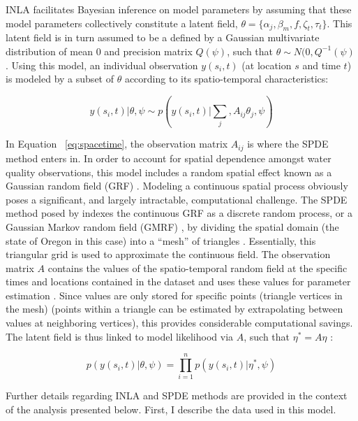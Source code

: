 \documentclass[12pt,a4paper,titlepage]{article}
\begin{document}
INLA facilitates Bayesian inference on model parameters by assuming that these model parameters collectively constitute a latent field, $\theta = \{\alpha_j,\beta_m,f,\zeta_t,\tau_t\}$. This latent field is in turn assumed to be a defined by a Gaussian multivariate distribution of mean 0 and precision matrix $Q(\psi)$, such that $\theta \sim N(0,Q^{-1}(\psi)$ \parencite{blangiardo2013,rue2005,rue2009,cosandey-godin2014}. Using this model, an individual observation $y(s_i,t)$ (at location $s$ and time $t$) is modeled by a subset of $\theta$ according to its spatio-temporal characteristics:

\begin{equation}
y(s_i,t)|\theta,\psi \sim p(y(s_i,t)|\sum_j,A_{ij}\theta_{j},\psi)
\label{eq:spacetime}
\end{equation}

In Equation ~\ref{eq:spacetime}, the observation matrix $A_{ij}$ is where the SPDE method enters in. In order to account for spatial dependence amongst water quality observations, this model includes a random spatial effect known as a Gaussian random field (GRF) \parencite{cosandey-godin2014}. Modeling a continuous spatial process obviously poses a significant, and largely intractable, computational challenge. The SPDE method posed by \textcite{lindgren2011} indexes the continuous GRF as a discrete random process, or a Gaussian Markov random field (GMRF) \parencite{lindgren2013}, by dividing the spatial domain (the state of Oregon in this case) into a “mesh” of triangles \parencite{blangiardo2013}. Essentially, this triangular grid is used to approximate the continuous field. The observation matrix $A$ contains the values of the spatio-temporal random field at the specific times and locations contained in the dataset and uses these values for parameter estimation \parencite{cosandey-godin2014}. Since values are only stored for specific points (triangle vertices in the mesh) (points within a triangle can be estimated by extrapolating between values at neighboring vertices), this provides considerable computational savings. The latent field is thus linked to model likelihood via $A$, such that $\eta^*=A\eta$ \parencite{cosandey-godin2014}:

\begin{equation}
p(y(s_i,t) | \theta,\psi) = \prod_{i=1}^{n} p(y(s_i,t) | \eta^{*},\psi)
\label{eq:spde}
\end{equation}

\noindent
Further details regarding INLA and SPDE methods are provided in the context of the analysis presented below. First, I describe the data used in this model.
\end{document}
